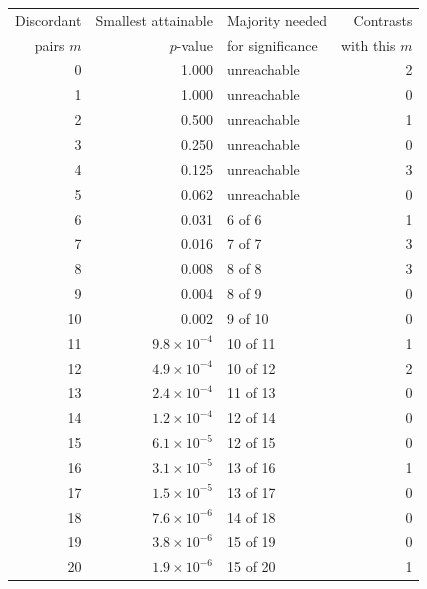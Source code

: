 \begin{tabular}{rrlr}
\toprule
Discordant & Smallest attainable & Majority needed & Contrasts \\
pairs $m$ & $p$-value & for significance & with this $m$ \\
\midrule
0 & 1.000 & unreachable & 2 \\
1 & 1.000 & unreachable & 0 \\
2 & 0.500 & unreachable & 1 \\
3 & 0.250 & unreachable & 0 \\
4 & 0.125 & unreachable & 3 \\
5 & 0.062 & unreachable & 0 \\
6 & 0.031 & 6 of 6 & 1 \\
7 & 0.016 & 7 of 7 & 3 \\
8 & 0.008 & 8 of 8 & 3 \\
9 & 0.004 & 8 of 9 & 0 \\
10 & 0.002 & 9 of 10 & 0 \\
11 & $9.8 \times 10^{-4}$ & 10 of 11 & 1 \\
12 & $4.9 \times 10^{-4}$ & 10 of 12 & 2 \\
13 & $2.4 \times 10^{-4}$ & 11 of 13 & 0 \\
14 & $1.2 \times 10^{-4}$ & 12 of 14 & 0 \\
15 & $6.1 \times 10^{-5}$ & 12 of 15 & 0 \\
16 & $3.1 \times 10^{-5}$ & 13 of 16 & 1 \\
17 & $1.5 \times 10^{-5}$ & 13 of 17 & 0 \\
18 & $7.6 \times 10^{-6}$ & 14 of 18 & 0 \\
19 & $3.8 \times 10^{-6}$ & 15 of 19 & 0 \\
20 & $1.9 \times 10^{-6}$ & 15 of 20 & 1 \\
\bottomrule
\end{tabular}

